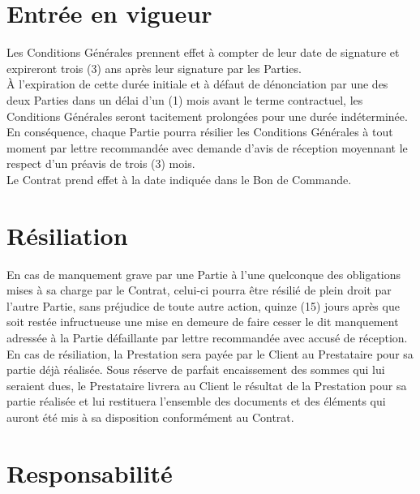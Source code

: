 \documentclass[8pt,french]{base}
\begin{document}
\begin{multicols*}{3}
\section{Entrée en vigueur}

Les Conditions Générales prennent effet à compter de leur date de signature et expireront trois (3) ans après leur signature par les Parties. \\
À l’expiration de cette durée initiale et à défaut de dénonciation par une des deux Parties dans un délai d’un (1) mois avant le terme contractuel, les Conditions Générales seront tacitement prolongées pour une durée indéterminée. En conséquence, chaque Partie pourra résilier les Conditions Générales à tout moment par lettre recommandée avec demande d’avis de réception moyennant le respect d’un préavis de trois (3) mois. \\
Le Contrat prend effet à la date indiquée dans le Bon de Commande.

\section{Résiliation}

En cas de manquement grave par une Partie à l’une quelconque des obligations mises à sa charge par le Contrat, celui-ci pourra être résilié de plein droit par l’autre Partie, sans préjudice de toute autre action, quinze (15) jours après que soit restée infructueuse une mise en demeure de faire cesser le dit manquement adressée à la Partie défaillante par lettre recommandée avec accusé de réception. \\
En cas de résiliation, la Prestation sera payée par le Client au Prestataire pour sa partie déjà réalisée. Sous réserve de parfait encaissement des sommes qui lui seraient dues, le Prestataire livrera au Client le résultat de la Prestation pour sa partie réalisée et lui restituera l’ensemble des documents et des éléments qui auront été mis à sa disposition conformément au Contrat.

\section{Responsabilité}


\end{multicols*}
\end{document}
